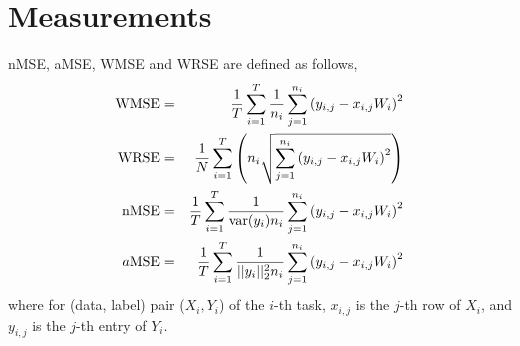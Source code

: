 \documentclass[twoside,leqno,twocolumn]{article}
\begin{document}
\section{Measurements}
nMSE, aMSE, WMSE and WRSE are defined as follows,
%
\begin{eqnarray}
\nonumber
{{\rm{WMSE}}} &=& \frac{1}{T}\sum\limits_{i = 1}^T {\frac{1}{{{n_i}}}} \sum\limits_{j = 1}^{{n_i}} {{{({y_{i,j}} - {x_{i,j}}{W_i})}^2}} \\
\nonumber
{{\rm{WRSE}}} &=& \frac{1}{N}\sum\limits_{i = 1}^T {\left( {{n_i}\sqrt {\sum\limits_{j = 1}^{{n_i}} {{{({y_{i,j}} - {x_{i,j}}{W_i})}^2}} } } \right)} \\
\nonumber
{{\rm{nMSE}}} &=& \frac{1}{T}\sum\limits_{i = 1}^T {\frac{1}{{{\rm{var}}({y_i}){n_i}}}\sum\limits_{j = 1}^{{n_i}} {{{({y_{i,j}} - {x_{i,j}}{W_i})}^2}} } \\
\nonumber
{a{\rm{MSE}}} &=& \frac{1}{T}\sum\limits_{i = 1}^T {\frac{1}{{||{y_i}||_2^2{n_i}}}\sum\limits_{j = 1}^{{n_i}} {{{({y_{i,j}} - {x_{i,j}}{W_i})}^2}} } \\
\end{eqnarray}
%
where for (data, label) pair ($X_i,Y_i$) of the $i$-th task, $x_{i,j}$ is the $j$-th row of $X_i$, and   $y_{i,j}$ is the $j$-th entry of $Y_i$.







\end{document}
